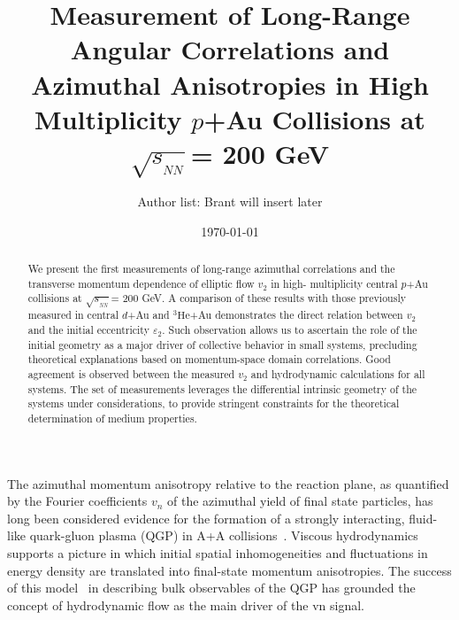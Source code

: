 \documentclass[%
reprint,
showpacs,preprintnumbers,
 amsmath,amssymb,
 aps,
]{revtex4-1}
\newcommand{\sqsn}{\mbox{$\sqrt{s_{_{NN}}}$}\xspace}
\newcommand{\dau}{\mbox{$d$+Au}\xspace}
\newcommand{\pau}{\mbox{$p$+Au}\xspace}
\newcommand{\hau}{\mbox{$^3\text{He}$+Au}\xspace}
\begin{document}
\title{Measurement of Long-Range Angular Correlations and Azimuthal Anisotropies in High Multiplicity \pau Collisions at \sqsn = 200 GeV}%

\author{Author list: Brant will insert later}

\date{\today}%

\begin{abstract}
We present the first measurements of long-range azimuthal correlations and the transverse momentum dependence of elliptic flow $v_2$ in high- multiplicity central \pau collisions at \sqsn = 200 GeV. A comparison of these results with those previously measured in central \dau and \hau demonstrates the direct relation between $v_2$ and the initial eccentricity $\varepsilon_2$. Such observation allows us to ascertain the role of the initial geometry as a major driver of collective behavior in small systems, precluding theoretical explanations based on momentum-space domain correlations. Good agreement is observed between the measured $v_2$ and hydrodynamic calculations for all systems. The set of measurements leverages the differential intrinsic geometry of the systems under considerations, to provide stringent constraints for the theoretical determination of medium properties.

\end{abstract}

\maketitle
%
%
The azimuthal momentum anisotropy relative to the reaction plane, as quantified by the Fourier coefficients $v_n$ of the azimuthal yield of final state particles, has long been considered evidence for the formation of a strongly interacting, fluid-like quark-gluon plasma (QGP) in A+A collisions~\cite{Snellings:2011sz}. Viscous hydrodynamics supports a picture in which initial spatial inhomogeneities and fluctuations in energy density are translated into final-state momentum anisotropies.  The success of this model~\cite{Luzum:2008cw} in describing bulk observables of the QGP has grounded the concept of hydrodynamic flow as the main driver of the vn signal.
\end{document}
